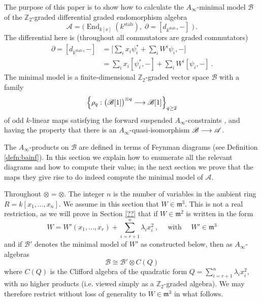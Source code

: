\documentclass[english,letter paper,12pt,leqno]{article}
\theoremstyle{example}
\numberwithin{equation}{section}
\def\stab{\operatorname{stab}}
\def\be{\begin{equation}}
\def\ee{\end{equation}}
\def\nZ{\mathds{Z}}
\DeclareMathOperator{\End}{End}
\begin{document}
The purpose of this paper is to show how to calculate the $A_\infty$-minimal model $\mathscr{B}$ of the $\nZ_2$-graded differential graded endomorphism algebra
\be\label{eq:defnaw}
\mathscr{A} = \Big( \End_{k[x]}(k^{\operatorname{stab}}), \; \partial = [d_{k^{\stab}},-] \; \Big)\,.
\ee 
The differential here is (throughout all commutators are graded commutators)
\begin{align*}
\partial = [d_{k^{\stab}},-] &= \Big[\sum_i x_i \psi_i^* + \sum_i W^i \psi_i, -\Big]\\
&= \sum_i x_i [\psi_i^*,-] + \sum_i W^i [\psi_i,-]\,.
\end{align*}
The minimal model is a finite-dimensional $\nZ_2$-graded vector space $\mathscr{B}$ with a family 
\[
\left\{ \rho_q: \big(\mathscr{B}[1]\big)^{\otimes q} \longrightarrow \mathscr{B}[1] \right\}_{q \ge 2}
\]
of odd $k$-linear maps satisfying the forward suspended $A_\infty$-constraints \cite{lazaroiu}, and having the property that there is an $A_\infty$-quasi-isomorphism $\mathscr{B} \longrightarrow \mathscr{A}$.

The $A_\infty$-products on $\mathscr{B}$ are defined in terms of Feynman diagrams (see Definition \ref{defn:bainf}). In this section we explain how to enumerate all the relevant diagrams and how to compute their value; in the next section we prove that the maps they give rise to do indeed compute the minimal model of $\mathscr{A}$. 

Throughout $\otimes = \otimes$. The integer $n$ is the number of variables in the ambient ring $R = k[x_1,\ldots,x_n]$. We assume in this section that $W \in \mathfrak{m}^3$. This is not a real restriction, as we will prove in Section \ref{??} that if $W \in \mathfrak{m}^2$ is written in the form
\be
W = W'(x_1,\ldots,x_r) + \sum_{i={r+1}}^n \lambda_i x_i^2\,, \quad \text{ with } \quad W' \in \mathfrak{m}^3
\ee
and if $\mathscr{B}'$ denotes the minimal model of $W'$ as constructed below, then as $A_\infty$-algebras
\be
\mathscr{B} \cong \mathscr{B}' \otimes C( Q )
\ee
where $C(Q)$ is the Clifford algebra of the quadratic form $Q = \sum_{i=r+1}^n \lambda_i x_i^2$, with no higher products (i.e. viewed simply as a $\nZ_2$-graded algebra). We may therefore restrict without loss of generality to $W \in \mathfrak{m}^3$ in what follows.
\end{document}
